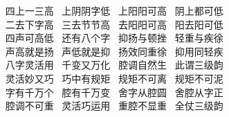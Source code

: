 {{\hspace*{10pt}~ 四上一三高~\hspace{40pt} 上阴阴字低~\hspace{40pt} 上阳阳可高~\hspace{40pt} 阴上都可低\\
\hspace*{10pt}~ 二去下字高~\hspace{40pt} 三去节节高~\hspace{40pt} 去阳阳可高~\hspace{40pt} 阳去阳可低\\
\hspace*{10pt}~ 四声可高低~\hspace{40pt} 还有八个字~\hspace{40pt} 抑扬与顿挫~\hspace{40pt} 轻重与疾徐\\
\hspace*{10pt}~ 声高就是扬~\hspace{40pt} 声低就是抑~\hspace{40pt} 扬效同重徐~\hspace{40pt} 抑用同轻疾\\
\hspace*{10pt}~ 八字灵活用~\hspace{40pt} 千变又万化~\hspace{40pt} 腔调自然生~\hspace{40pt} 此谓三级韵\\
\hspace*{10pt}~ 灵活妙又巧~\hspace{40pt} 巧中有规矩~\hspace{40pt} 规矩不可离~\hspace{40pt} 规矩不可泥\\
\hspace*{10pt}~ 字有千万个~\hspace{40pt} 腔有千万变~\hspace{40pt} 舍字从腔圆~\hspace{40pt} 舍腔从字正\\
\hspace*{10pt}~ 腔调不可重~\hspace{40pt} 灵活巧运用~\hspace{40pt} 重腔不显重~\hspace{40pt} 全仗三级韵\\}
}
